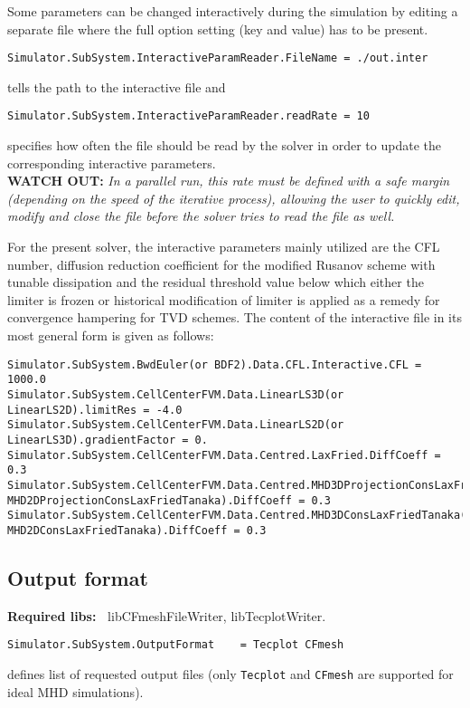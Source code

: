 \documentclass[11pt]{article}
\begin{document}
Some parameters can be changed interactively during the simulation by editing a separate file
where the full option setting (key and value) has to be present.
\begin{lstlisting}[breaklines]
Simulator.SubSystem.InteractiveParamReader.FileName = ./out.inter
\end{lstlisting}
tells the path to the interactive file and
\begin{lstlisting}[breaklines]
Simulator.SubSystem.InteractiveParamReader.readRate = 10
\end{lstlisting}
specifies how often the file should be read by the solver in order to update the corresponding interactive parameters.\\
{\bf WATCH OUT:}  {\it In a parallel run, this rate must be defined with a safe margin (depending on the speed of the iterative process),
  allowing the user to quickly edit, modify and close the file before the solver tries to read the file as well.}

For the present solver, the interactive parameters mainly utilized are the CFL number, diffusion reduction coefficient for the modified Rusanov scheme with tunable dissipation and the residual threshold value below which either the limiter is frozen or historical modification of limiter is applied as a remedy for convergence hampering for TVD schemes. The content of the interactive file in its most general form is given as follows:

\begin{lstlisting}[breaklines]
Simulator.SubSystem.BwdEuler(or BDF2).Data.CFL.Interactive.CFL = 1000.0
Simulator.SubSystem.CellCenterFVM.Data.LinearLS3D(or LinearLS2D).limitRes = -4.0
Simulator.SubSystem.CellCenterFVM.Data.LinearLS2D(or LinearLS3D).gradientFactor = 0.
Simulator.SubSystem.CellCenterFVM.Data.Centred.LaxFried.DiffCoeff = 0.3
Simulator.SubSystem.CellCenterFVM.Data.Centred.MHD3DProjectionConsLaxFriedTanaka(or MHD2DProjectionConsLaxFriedTanaka).DiffCoeff = 0.3
Simulator.SubSystem.CellCenterFVM.Data.Centred.MHD3DConsLaxFriedTanaka(or MHD2DConsLaxFriedTanaka).DiffCoeff = 0.3
\end{lstlisting}

\subsection{Output format}

{\bf Required libs:~} libCFmeshFileWriter, libTecplotWriter.

\begin{lstlisting}[breaklines]
Simulator.SubSystem.OutputFormat    = Tecplot CFmesh
\end{lstlisting}
defines list of requested output files (only {\tt Tecplot} and {\tt CFmesh} are supported for ideal MHD simulations).
\end{document}
